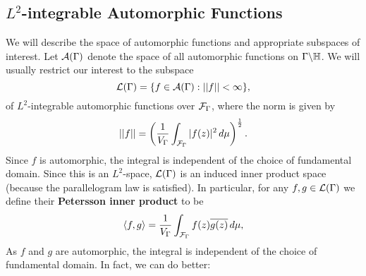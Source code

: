     \subsection*{\texorpdfstring{$L^{2}$}{L^{2}}-integrable Automorphic Functions}
      We will describe the space of automorphic functions and appropriate subspaces of interest. Let $\mathcal{A}(\Gamma)$ denote the space of all automorphic functions on $\Gamma\backslash\mathbb{H}$. We will usually restrict our interest to the subspace
      \[
        \mathcal{L}(\Gamma) = \{f \in \mathcal{A}(\Gamma):||f|| < \infty\},
      \]
      of $L^{2}$-integrable automorphic functions over $\mathcal{F}_{\Gamma}$, where the norm is given by
      \[
        ||f|| = \left(\frac{1}{V_{\Gamma}}\int_{\mathcal{F}_{\Gamma}}|f(z)|^{2}\,d\mu\right)^{\frac{1}{2}}.
      \]
      Since $f$ is automorphic, the integral is independent of the choice of fundamental domain. Since this is an $L^{2}$-space, $\mathcal{L}(\Gamma)$ is an induced inner product space (because the parallelogram law is satisfied). In particular, for any $f,g \in \mathcal{L}(\Gamma)$ we define their \textbf{Petersson inner product} to be
      \[
        \langle f,g\rangle = \frac{1}{V_{\Gamma}}\int_{\mathcal{F}_{\Gamma}}f(z)\overline{g(z)}\,d\mu,
      \]
      As $f$ and $g$ are automorphic, the integral is independent of the choice of fundamental domain. In fact, we can do better:

